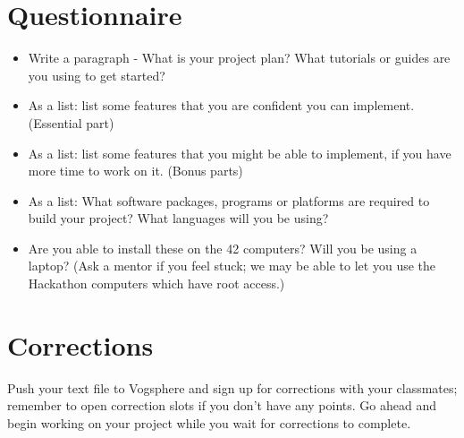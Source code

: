 \documentclass{42-en}
\begin{document}

\chapter{Questionnaire}

\begin{itemize}

	\item Write a paragraph - What is your project plan? What tutorials or guides are you using to get started?
	\item As a list: list some features that you are confident you can implement. (Essential part)
	\item As a list: list some features that you might be able to implement, if you have more time to work on it. (Bonus parts)
	\item As a list: What software packages, programs or platforms are required to build your project? What languages will you be using?
	\item Are you able to install these on the 42 computers? Will you be using a laptop? (Ask a mentor if you feel stuck; we may be able to let you use the Hackathon computers which have root access.)

\end{itemize}



\chapter{Corrections}

Push your text file to Vogsphere and sign up for corrections with your classmates; remember to open correction slots if you don't have any points. Go ahead and begin working on your project while you wait for corrections to complete. 
\end{document}
